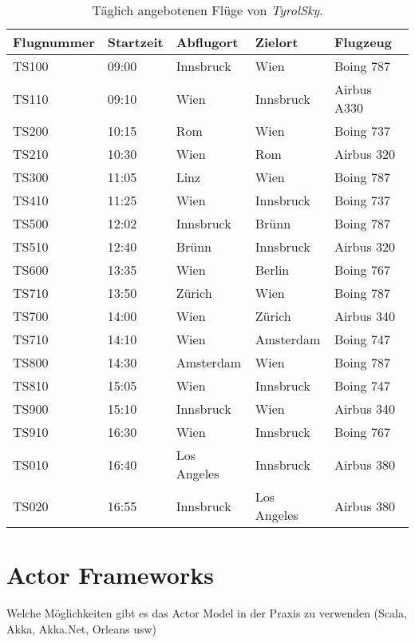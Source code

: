 \begin{table}
    \centering
    \begin{tabular}{lllll}
    Flugnummer & Startzeit  & Abflugort         & Zielort       & Flugzeug        \\ \hline   %
        TS100   & 09:00     & Innsbruck         & Wien          &  Boing 787      \\           %
        TS110   & 09:10     & Wien              & Innsbruck     &  Airbus A330    \\           %
        TS200   & 10:15     & Rom               & Wien          &  Boing 737      \\           %
        TS210   & 10:30     & Wien          	& Rom           &  Airbus 320     \\           %
        TS300   & 11:05     & Linz              & Wien          &  Boing 787      \\           %
        TS410   & 11:25     & Wien              & Innsbruck     &  Boing 737      \\           %
        TS500   & 12:02     & Innsbruck         & Brünn         &  Boing 787      \\           %
        TS510   & 12:40     & Brünn             & Innsbruck     &  Airbus 320     \\           %
        TS600   & 13:35     & Wien              & Berlin        &  Boing 767      \\           %
        TS710   & 13:50     & Zürich            & Wien          &  Boing 787      \\           %
        TS700   & 14:00     & Wien              & Zürich        &  Airbus 340     \\           %
        TS710   & 14:10     & Wien              & Amsterdam     &  Boing 747      \\           %
        TS800   & 14:30     & Amsterdam         & Wien          &  Boing 787      \\           %
        TS810   & 15:05     & Wien              & Innsbruck     &  Boing 747      \\           %
        TS900   & 15:10     & Innsbruck         & Wien          &  Airbus 340     \\           %
        TS910   & 16:30     & Wien              & Innsbruck     &  Boing 767      \\           %
        TS010   & 16:40     & Los Angeles       & Innsbruck     &  Airbus 380     \\           %
        TS020   & 16:55     & Innsbruck         & Los Angeles   &  Airbus 380     \\          %
    \end{tabular}
    \caption{Täglich angebotenen Flüge von \textit{TyrolSky}.}
    \label{tab:TyrolSky:destinations}
\end{table}

\section{Actor Frameworks}\label{sec:ActorFrameworks}
Welche Möglichkeiten gibt es das Actor Model in der Praxis zu verwenden (Scala, Akka, Akka.Net, Orleans usw)